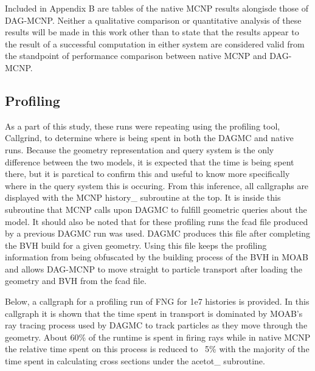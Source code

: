 \documentclass[10pt, a4paper]{article}
\begin{document}
Included in Appendix B are tables of the native MCNP results alongisde those of DAG-MCNP. Neither a qualitative comparison or quantitative analysis of these results will be made in this work other than to state that the results appear to the result of a successful computation in either system are considered valid from the standpoint of performance comparison between native MCNP and DAG-MCNP.

\subsection{Profiling}%

As a part of this study, these runs were repeating using the profiling tool, Callgrind, to determine where is being spent in both the DAGMC and native runs. Because the geometry representation and query system is the only difference between the two models, it is expected that the time is being spent there, but it is parctical to confirm this and useful to know more specifically where in the query system this is occuring. From this inference, all callgraphs are displayed with the MCNP history\_ subroutine at the top. It is inside this subroutine that MCNP calls upon DAGMC to fulfill geometric queries about the model. It should also be noted that for these profiling runs the fcad file produced by a previous DAGMC run was used. DAGMC produces this file after completing the BVH build for a given geometry. Using this file keeps the profiling information from being obfuscated by the building process of the BVH in MOAB and allows DAG-MCNP to move straight to particle transport after loading the geometry and BVH from the fcad file. 

Below, a callgraph for a profiling run of FNG for 1e7 histories is provided. In this callgraph it is shown that the time spent in transport is dominated by MOAB's ray tracing process used by DAGMC to track particles as they move through the geometry. About 60\% of the runtime is spent in firing rays while in native MCNP the relative time spent on this process is reduced to ~5\% with the majority of the time spent in calculating cross sections under the acetot\_ subroutine. 
\end{document}
